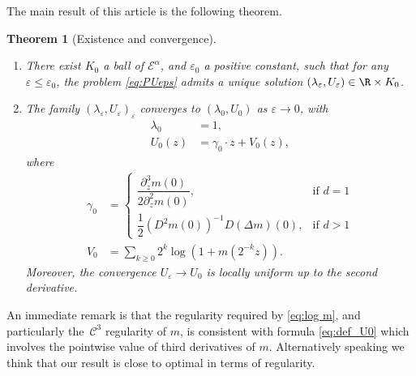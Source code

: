 \documentclass[JEP,XML,SOM,Unicode]{cedram}
\let\mathcal\mathscr
\newenvironment{enumeratei}
{\bgroup\def\theenumi{\roman{enumi}}\def\theenumii{\arabic{enumii}}\begin{enumerate}}
{\end{enumerate}\egroup}
\newcommand{\cC}{\mathcal{C}}
\theoremstyle{plain}
\newtheorem{thm}{Theorem}[section]
\theoremstyle{definition}
\let\eps\varepsilon
\let\ds\displaystyle
\newcommand{\Ea}{\mathcal{E}^\alpha}
\begin{document}
The main result of this article is the following theorem.
\skpt
\begin{thm}[Existence and convergence]\label{convergence PUeps}\begin{enumeratei}
\item\label{convergence PUeps1}
There exist $K_0$ a ball of $\Ea$, and $\eps_0 $ a positive constant, such that for any $\eps \leq \eps_0$, the problem \eqref{eq:PUeps} admits a unique solution $(\lambda_\eps, U_\eps) \in \R \times K_0$.

\item\label{convergence PUeps2}
The family $(\lambda_\eps,U_ \eps)_{\eps}$ converges to $(\lambda_0,U_0)$ as $\eps\to0$, with
\begin{align}
\label{eq:def_lambda0} \lambda_0 & = 1, \\
\label{eq:def_U0} \ds U_0(z) & = \gamma_0 \cdot z + V_0(z),
\end{align}
where
\begin{equation}
\label{eq:gamma0value}
\begin{split}
\gamma_0 &=
\begin{cases}
\dfrac{\partial^3_z m(0)}{2 \partial ^2_z m(0)}, &\text{if } d=1 \\[10pt]
\dfrac{1}{2} \left (D^2 m(0)\right)^{-1} D (\Delta m)(0),&\text{if } d>1
\end{cases}\\[5pt]
V_0 &= \sum_{k\geq 0} 2^k \log \left(1 + m(2^{-k}z)\right).
\end{split}
\end{equation}
Moreover, the convergence $U_\eps \to U_0$ is locally uniform up to the second derivative.
\end{enumeratei}
\end{thm}

An immediate remark is that the regularity required by \eqref{eq:log m}, and particularly the~$\cC^3$ regularity of $m$, is consistent with formula \eqref{eq:def_U0} which involves the pointwise value of third derivatives of $m$. Alternatively speaking we think that our result is close to optimal in terms of regularity.
\end{document}
